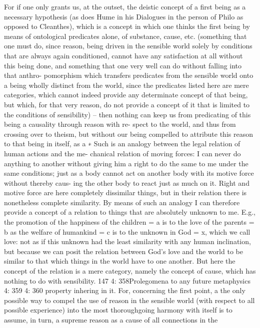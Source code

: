 For if one only grants us, at the outset, the deistic concept of a ﬁrst
being as a necessary hypothesis (as does Hume in his Dialogues in the
person of Philo as opposed to Cleanthes), which is a concept in which
one thinks the ﬁrst being by means of ontological predicates alone, of
substance, cause, etc. (something that one must do, since reason, being
driven in the sensible world solely by conditions that are always again
conditioned, cannot have any satisfaction at all without this being done,
and something that one very well can do without falling into that anthro-
pomorphism which transfers predicates from the sensible world onto a
being wholly distinct from the world, since the predicates listed here are
mere categories, which cannot indeed provide any determinate concept
of that being, but which, for that very reason, do not provide a concept
of it that is limited to the conditions of sensibility) – then nothing can
keep us from predicating of this being a causality through reason with re-
spect to the world, and thus from crossing over to theism, but without
our being compelled to attribute this reason to that being in itself, as a
∗
Such is an analogy between the legal relation of human actions and the me-
chanical relation of moving forces: I can never do anything to another without
giving him a right to do the same to me under the same conditions; just as a
body cannot act on another body with its motive force without thereby caus-
ing the other body to react just as much on it. Right and motive force are here
completely dissimilar things, but in their relation there is nonetheless complete
similarity. By means of such an analogy I can therefore provide a concept of a
relation to things that are absolutely unknown to me. E.g., the promotion of
the happiness of the children = a is to the love of the parents = b as the welfare
of humankind = c is to the unknown in God = x, which we call love: not as if
this unknown had the least similarity with any human inclination, but because
we can posit the relation between God’s love and the world to be similar to
that which things in the world have to one another. But here the concept of the
relation is a mere category, namely the concept of cause, which has nothing to
do with sensibility.
147
4: 358Prolegomena to any future metaphysics
4: 359
4: 360
property inhering in it. For, concerning the ﬁrst point, a the only possible
way to compel the use of reason in the sensible world (with respect to all
possible experience) into the most thoroughgoing harmony with itself is
to assume, in turn, a supreme reason as a cause of all connections in the
